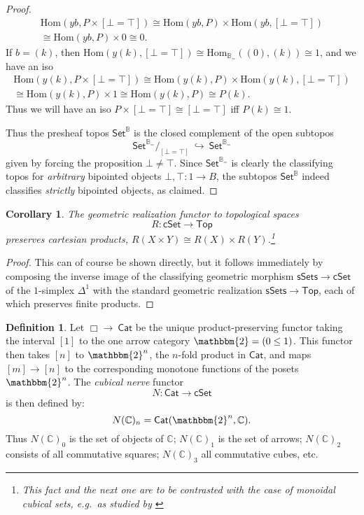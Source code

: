 \documentclass[12pt]{article}
\newcommand{\eg}{\emph{e.g.}}
\newcommand{\bbtwo}{\ensuremath{\mathbbm{2}}}
\newcommand{\B}{\ensuremath{\mathbb{B}}}
\newcommand{\bbC}{\ensuremath{\mathbb{C}}}
\newcommand{\Set}{\ensuremath{\mathsf{Set}}}
\newcommand{\Cat}{\ensuremath{\mathsf{Cat}}}
\newcommand{\cSet}{\ensuremath{\mathsf{cSet}}}
\renewcommand{\hom}{\ensuremath{\mathrm{Hom}}}
\newcommand{\hook}{\ensuremath{\hookrightarrow}}
\renewcommand{\to}{\ensuremath{\rightarrow}}
\newtheorem{corollary}[theorem]{Corollary}
\theoremstyle{remark}
\theoremstyle{definition}
\newtheorem{definition}[theorem]{Definition}
\begin{document}
\begin{proof}
\[\begin{split}
\hom(yb, P\times [\bot=\top] ) \cong \hom(yb, P) \times \hom(yb, [\bot=\top])\\
 \cong \hom(yb, P) \times 0 \cong 0.
 \end{split}
\]
If $b = (k)$, then $\hom(y(k), [\bot=\top]) \cong \hom_{\B_=}((0), (k)) \cong 1$, and we have an iso
\[
\begin{split}
\hom(y(k), P\times [\bot=\top] ) \cong \hom(y(k), P) \times \hom(y(k), [\bot=\top]) \\
\cong \hom(y(k), P) \times 1 \cong \hom(y(k), P) \cong P(k).
\end{split}
\]
Thus we will have an iso $P\times [\bot=\top] \cong [\bot=\top] $ iff $P(k) \cong 1$.

Thus the presheaf topos $\Set^\B$ is the closed complement of the open subtopos $$\Set^{\B_=}/_{[\bot=\top]}\ \hook\ \Set^{\B_=}$$ given by forcing the proposition $\bot \neq \top$.  Since $\Set^{\B_=}$ is clearly the classifying topos for \emph{arbitrary} bipointed objects $\bot, \top : 1\to B$, the subtopos $\Set^\B$ indeed classifies \emph{strictly} bipointed objects, as claimed.
\end{proof}


\begin{corollary}
The geometric realization functor to topological spaces 
$$R: \cSet \to \mathsf{Top}$$
preserves cartesian products, $R(X\times Y) \cong R(X)\times R(Y)$.\footnote{This fact and the next one are to be contrasted with the case of monoidal cubical sets, \eg\ as studied by \cite{Jardine,Dougherty}}
\end{corollary}

\begin{proof}
This can of course be shown directly, but it follows immediately by composing the inverse image of the classifying geometric morphism $\mathsf{sSets} \to \cSet$ of the $1$-simplex $\Delta^1$ with the standard geometric realization $\mathsf{sSets} \to \mathsf{Top}$, each of which preserves finite products.
\end{proof}

\begin{definition}
Let $\Box \to\  \Cat$ be the unique product-preserving functor taking the interval $[1]$ to the one arrow  category $\bbtwo = (0\leq1)$.  This functor then takes $[n]$ to $\bbtwo^n$, the $n$-fold product in $\Cat$, and maps $[m] \to [n]$  to the corresponding monotone functions of the posets $\bbtwo^n$.  The  \emph{cubical nerve} functor $$N : \Cat \to \cSet$$ is then defined by:
\[
N(\bbC)_n = \Cat(\bbtwo^n, \bbC).
\]
Thus $N(\bbC)_0$  is the set of objects of \bbC; $N(\bbC)_1$ is the set of arrows; $N(\bbC)_2$ consists of all commutative squares; $N(\bbC)_3$ all commutative cubes, etc. 
\end{definition}
\end{document}
